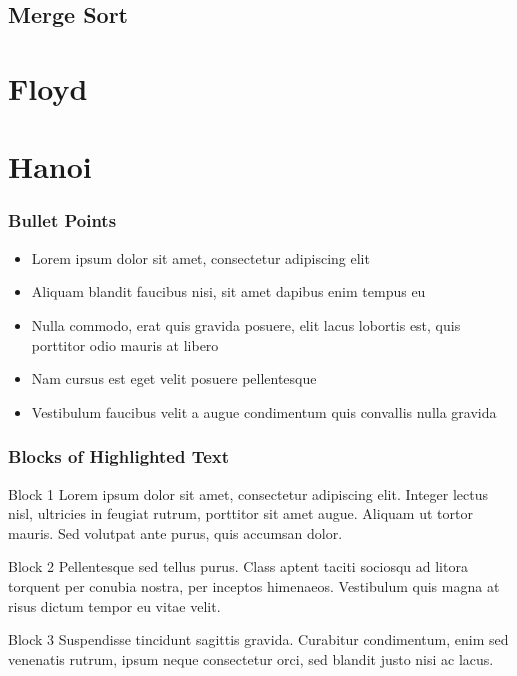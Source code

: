 \documentclass{beamer}
\begin{document}
\subsection{Merge Sort}

\section{Floyd}
\section{Hanoi}




\begin{frame}
\frametitle{Bullet Points}
\begin{itemize}
\item Lorem ipsum dolor sit amet, consectetur adipiscing elit
\item Aliquam blandit faucibus nisi, sit amet dapibus enim tempus eu
\item Nulla commodo, erat quis gravida posuere, elit lacus lobortis est, quis porttitor odio mauris at libero
\item Nam cursus est eget velit posuere pellentesque
\item Vestibulum faucibus velit a augue condimentum quis convallis nulla gravida
\end{itemize}
\end{frame}


\begin{frame}
\frametitle{Blocks of Highlighted Text}
\begin{block}{Block 1}
Lorem ipsum dolor sit amet, consectetur adipiscing elit. Integer lectus nisl, ultricies in feugiat rutrum, porttitor sit amet augue. Aliquam ut tortor mauris. Sed volutpat ante purus, quis accumsan dolor.
\end{block}

\begin{block}{Block 2}
Pellentesque sed tellus purus. Class aptent taciti sociosqu ad litora torquent per conubia nostra, per inceptos himenaeos. Vestibulum quis magna at risus dictum tempor eu vitae velit.
\end{block}

\begin{block}{Block 3}
Suspendisse tincidunt sagittis gravida. Curabitur condimentum, enim sed venenatis rutrum, ipsum neque consectetur orci, sed blandit justo nisi ac lacus.
\end{block}
\end{frame}
\end{document}
